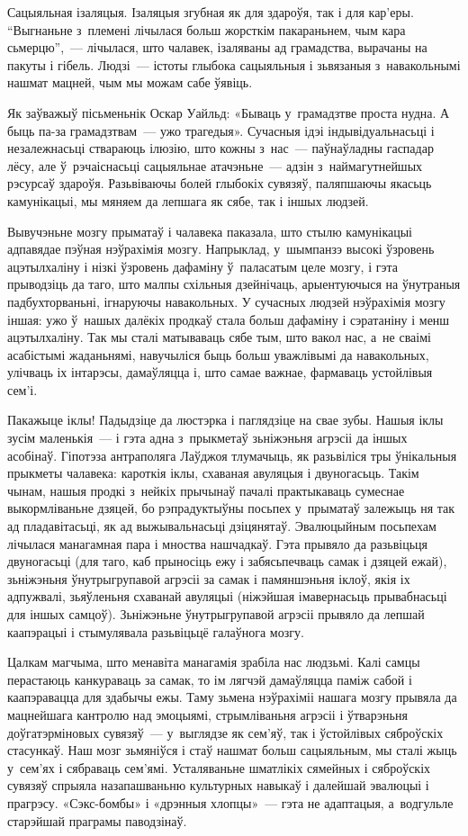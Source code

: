 Сацыяльная ізаляцыя. Ізаляцыя згубная як для здароўя, так і для кар'еры. ``Выгнаньне з~племені лічылася больш жорсткім пакараньнем, чым кара сьмерцю'',~--- лічылася, што чалавек, ізаляваны ад грамадства, вырачаны на пакуты і гібель. Людзі~--- істоты глыбока сацыяльныя і зьвязаныя з~навакольнымі нашмат мацней, чым мы можам сабе ўявіць.

Як заўважыў пісьменьнік Оскар Уайльд: «Бываць у~грамадзтве проста нудна. А быць па-за грамадзтвам~--- ужо трагедыя». Сучасныя ідэі індывідуальнасьці і незалежнасьці ствараюць ілюзію, што кожны з~нас~--- паўнаўладны гаспадар лёсу, але ў~рэчаіснасьці сацыяльнае атачэньне~--- адзін з~наймагутнейшых рэсурсаў здароўя. Разьвіваючы болей глыбокіх сувязяў, паляпшаючы якасьць камунікацыі, мы мяняем да лепшага як сябе, так і іншых людзей.

Вывучэньне мозгу прыматаў і чалавека паказала, што стылю камунікацыі адпавядае пэўная нэўрахімія мозгу. Напрыклад, у~шымпанзэ высокі ўзровень ацэтылхаліну і нізкі ўзровень дафаміну ў~паласатым целе мозгу, і гэта прыводзіць да таго, што малпы схільныя дзейнічаць, арыентуючыся на ўнутраныя падбухторваньні, ігнаруючы навакольных. У сучасных людзей нэўрахімія мозгу іншая: ужо ў~нашых далёкіх продкаў стала больш дафаміну і сэратаніну і менш ацэтылхаліну. Так мы сталі матываваць сябе тым, што вакол нас, а~не сваімі асабістымі жаданьнямі, навучыліся быць больш уважлівымі да навакольных, улічваць іх інтарэсы, дамаўляцца і, што самае важнае, фармаваць устойлівыя сем'і.

Пакажыце іклы! Падыдзіце да люстэрка і паглядзіце на свае зубы. Нашыя іклы зусім маленькія~--- і гэта адна з~прыкметаў зьніжэньня агрэсіі да іншых асобінаў. Гіпотэза антраполяга Лаўджоя тлумачыць, як разьвіліся тры ўнікальныя прыкметы чалавека: кароткія іклы, схаваная авуляцыя і двуногасьць. Такім чынам, нашыя продкі з~нейкіх прычынаў пачалі практыкаваць сумеснае выкормліваньне дзяцей, бо рэпрадуктыўны посьпех у~прыматаў залежыць ня так ад пладавітасьці, як ад выжывальнасьці дзіцянятаў. Эвалюцыйным посьпехам лічылася манагамная пара і мноства нашчадкаў. Гэта прывяло да разьвіцьця двуногасьці (для таго, каб прыносіць ежу і забясьпечваць самак і дзяцей ежай), зьніжэньня ўнутрыгрупавой агрэсіі за самак і памяншэньня іклоў, якія іх адпужвалі, зьяўленьня схаванай авуляцыі (ніжэйшая імавернасьць прывабнасьці для іншых самцоў). Зьніжэньне ўнутрыгрупавой агрэсіі прывяло да лепшай каапэрацыі і стымулявала разьвіцьцё галаўнога мозгу.

Цалкам магчыма, што менавіта манагамія зрабіла нас людзьмі. Калі самцы перастаюць канкураваць за самак, то ім лягчэй дамаўляцца паміж сабой і каапэравацца для здабычы ежы. Таму зьмена нэўрахіміі нашага мозгу прывяла да мацнейшага кантролю над эмоцыямі, стрымліваньня агрэсіі і ўтварэньня доўгатэрміновых сувязяў~--- у~выглядзе як сем'яў, так і ўстойлівых сяброўскіх стасункаў. Наш мозг зьмяніўся і стаў нашмат больш сацыяльным, мы сталі жыць у~сем'ях і сябраваць сем'ямі. Усталяваньне шматлікіх сямейных і сяброўскіх сувязяў спрыяла назапашваньню культурных навыкаў і далейшай эвалюцыі і прагрэсу. «Сэкс-бомбы» і «дрэнныя хлопцы»~--- гэта не адаптацыя, а~водгульле старэйшай праграмы паводзінаў.

